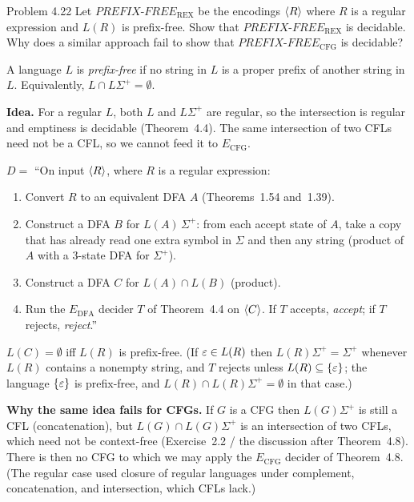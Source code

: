 \begin{question}{Problem 4.22}
Let $\mathit{PREFIX\text{-}FREE}_{\mathrm{REX}}$ be the encodings $\langle R\rangle$ where $R$ is a regular expression and $L(R)$ is prefix-free.
Show that $\mathit{PREFIX\text{-}FREE}_{\mathrm{REX}}$ is decidable. Why does a similar approach fail to show that $\mathit{PREFIX\text{-}FREE}_{\mathrm{CFG}}$ is decidable?
\end{question}
\begin{soln}
A language $L$ is \emph{prefix-free} if no string in $L$ is a proper prefix of another string in $L$. Equivalently, $L\cap L\Sigma^+=\emptyset$.

\textbf{Idea.} For a regular $L$, both $L$ and $L\Sigma^+$ are regular, so the intersection is regular and emptiness is decidable (Theorem~4.4). The same intersection of two CFLs need not be a CFL, so we cannot feed it to $E_{\mathrm{CFG}}$.

$D=$ ``On input $\langle R\rangle$, where $R$ is a regular expression:
\begin{enumerate}
\item Convert $R$ to an equivalent DFA $A$ (Theorems~1.54 and~1.39).
\item Construct a DFA $B$ for $L(A)\,\Sigma^+$: from each accept state of $A$, take a copy that has already read one extra symbol in $\Sigma$ and then any string (product of $A$ with a 3-state DFA for $\Sigma^+$).
\item Construct a DFA $C$ for $L(A)\cap L(B)$ (product).
\item Run the $E_{\mathrm{DFA}}$ decider $T$ of Theorem~4.4 on $\langle C\rangle$. If $T$ accepts, \emph{accept}; if $T$ rejects, \emph{reject}.''
\end{enumerate}
$L(C)=\emptyset$ iff $L(R)$ is prefix-free. (If $\varepsilon\in L(R)$ then $L(R)\Sigma^+=\Sigma^+$ whenever $L(R)$ contains a nonempty string, and $T$ rejects unless $L(R)\subseteq\{\varepsilon\}$; the language $\{\varepsilon\}$ is prefix-free, and $L(R)\cap L(R)\Sigma^+=\emptyset$ in that case.)

\textbf{Why the same idea fails for CFGs.} If $G$ is a CFG then $L(G)\Sigma^+$ is still a CFL (concatenation), but $L(G)\cap L(G)\Sigma^+$ is an intersection of two CFLs, which need not be context-free (Exercise~2.2 / the discussion after Theorem~4.8). There is then no CFG to which we may apply the $E_{\mathrm{CFG}}$ decider of Theorem~4.8. (The regular case used closure of regular languages under complement, concatenation, and intersection, which CFLs lack.)
\end{soln}

